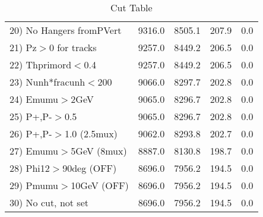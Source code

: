 \begin{table}[h!]
\begin{tabular}{||l||r|r|r|r||}
 20) No Hangers fromPVert &      9316.0 &      8505.1 &       207.9 &         0.0 \\
 21) Pz$>$0 for tracks    &      9257.0 &      8449.2 &       206.5 &         0.0 \\
 22) Thprimord$<$0.4      &      9257.0 &      8449.2 &       206.5 &         0.0 \\
 23) Nunh*fracunh$<$200   &      9066.0 &      8297.7 &       202.8 &         0.0 \\
 24) Emumu$>$2GeV         &      9065.0 &      8296.7 &       202.8 &         0.0 \\
 25) P+,P-$>$0.5          &      9065.0 &      8296.7 &       202.8 &         0.0 \\
 26) P+,P-$>$1.0 (2.5mux) &      9062.0 &      8293.8 &       202.7 &         0.0 \\
 27) Emumu$>$5GeV  (8mux) &      8887.0 &      8130.8 &       198.7 &         0.0 \\
 28) Phi12$>$90deg  (OFF) &      8696.0 &      7956.2 &       194.5 &         0.0 \\
 29) Pmumu$>$10GeV  (OFF) &      8696.0 &      7956.2 &       194.5 &         0.0 \\
 30) No cut, not set      &      8696.0 &      7956.2 &       194.5 &         0.0 \\
 \hline
 \hline
 \end{tabular}
 \caption{Cut Table \cohpip }
 \label{tab-cut_copip}
 \end{table}
